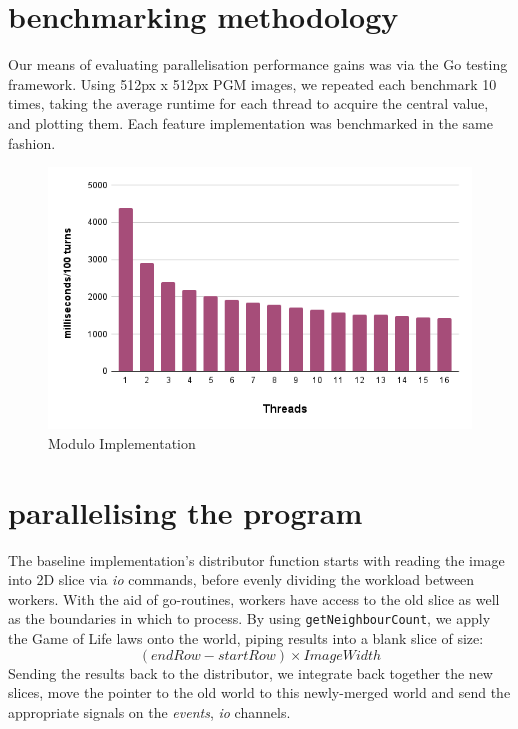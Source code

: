 \documentclass[twoside,twocolumn]{article}
\begin{document}
\section{benchmarking methodology}
Our means of evaluating parallelisation performance gains 
was via the Go testing framework. Using 512px x 512px PGM images, we 
repeated each benchmark 10 times, taking the average runtime for each thread to acquire the central value, 
and plotting them. Each feature implementation was benchmarked in the same fashion.
\begin{figure}
  \includegraphics[width=\linewidth]{modulo.png}
  \caption{Modulo Implementation}
  \label{fig:chart1}
\end{figure}

\section{parallelising the program}
The baseline implementation's distributor function starts with
reading the image into 2D slice via \textit{io} commands, before evenly dividing 
the workload between workers. With the aid of go-routines, workers have access to the old slice
as well as the boundaries in which to process. By using \texttt{getNeighbourCount}, we apply the Game of Life
laws onto the world, piping results into a blank slice of size: \[( endRow - startRow ) \times ImageWidth\]
Sending the results back to the distributor, we integrate back together the new slices, move the pointer to the old world
to this newly-merged world and send the appropriate signals on the \textit{events}, \textit{io} channels.
\end{document}
